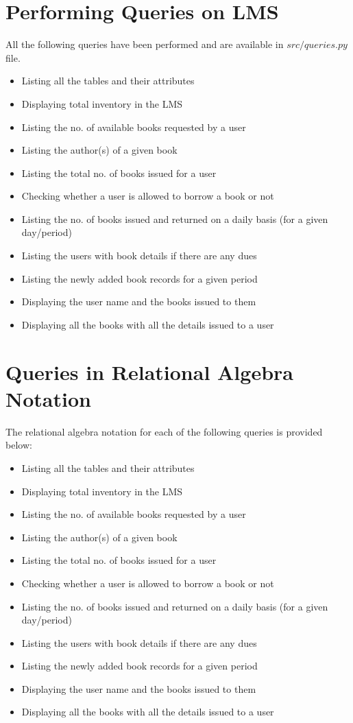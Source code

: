 \documentclass{article}
\begin{document}
\section{Performing Queries on LMS}
All the following queries have been performed and are available in $\textit{src/queries.py}$ file.
\begin{itemize}
    \item Listing all the tables and their attributes
    \item Displaying total inventory in the LMS
    \item Listing the no. of available books requested by a user
    \item Listing the author(s) of a given book
    \item Listing the total no. of books issued for a user
    \item Checking whether a user is allowed to borrow a book or not
    \item Listing the no. of books issued and returned on a daily basis (for a given day/period)
    \item Listing the users with book details if there are any dues
    \item Listing the newly added book records for a given period
    \item Displaying the user name and the books issued to them
    \item Displaying all the books with all the details issued to a user
\end{itemize}

\section{Queries in Relational Algebra Notation}
The relational algebra notation for each of the following queries is provided below:
\begin{itemize}
    \item Listing all the tables and their attributes
    \item Displaying total inventory in the LMS
    \item Listing the no. of available books requested by a user
    \item Listing the author(s) of a given book
    \item Listing the total no. of books issued for a user
    \item Checking whether a user is allowed to borrow a book or not
    \item Listing the no. of books issued and returned on a daily basis (for a given day/period)
    \item Listing the users with book details if there are any dues
    \item Listing the newly added book records for a given period
    \item Displaying the user name and the books issued to them
    \item Displaying all the books with all the details issued to a user
\end{itemize}
\end{document}
